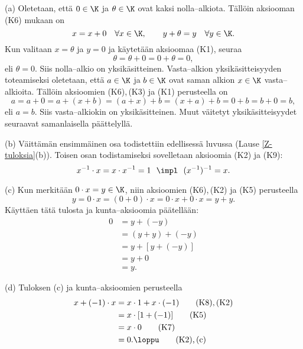 \tod (a) Oletetaan, että $0 \in \K$ ja $\theta \in \K$ ovat kaksi nolla--alkiota. Tällöin
aksiooman (K6) mukaan on
\[
x = x + 0 \quad \forall x \in \K, \quad \quad y + \theta = y \quad \forall y \in \K.
\]
Kun valitaan $x = \theta$ ja $y = 0$ ja käytetään aksioomaa (K1), seuraa
\[
\theta = \theta + 0 = 0 + \theta = 0,
\]
eli $\theta = 0$. Siis nolla--alkio on yksikäsitteinen. Vasta--alkion yksikäsitteisyyden 
toteamiseksi oletetaan, että $a\in\K$ ja $b\in\K$ ovat saman alkion $x \in \K$ 
vasta--alkioita. Tällöin aksioomien (K6),\,(K3) ja (K1) perusteella on
\[
a=a+0=a+(x+b)=(a+x)+b=(x+a)+b=0+b=b+0=b,
\]
eli $a=b$. Siis vasta--alkiokin on yksikäsitteinen. Muut väitetyt yksikäsitteisyydet 
seuraavat samanlaisella päättelyllä.

(b) Väittämän ensimmäinen osa todistettiin edellisessä luvussa (Lause \ref{Z-tuloksia}(b)).
Toisen osan todistamiseksi sovelletaan aksioomia (K2) ja (K9):
\[
x^{-1} \cdot x = x \cdot x^{-1} = 1\ \ \impl\ \ (x^{-1})^{-1}=x.
\]

(c) Kun merkitään $0 \cdot x = y\in\K$, niin aksioomien (K6),\,(K2) ja (K5) perusteella
\begin{equation}
y = 0 \cdot x = (0 + 0) \cdot x = 0 \cdot x + 0 \cdot x = y+y.  \tag{$\star$}
\end{equation}
Käyttäen tätä tulosta ja kunta--aksioomia päätellään:
\begin{align}
0 &= y+(-y)      \tag{K7} \\
  &= (y+y)+(-y)  \tag{$\star$} \\
  &= y+[y+(-y)]  \tag{K3} \\
  &= y+0         \tag{K7} \\
  &= y.          \tag{K6}
\end{align}

(d) Tuloksen (c) ja kunta--aksioomien perusteella
\begin{align}
x + (-1) \cdot x &= x \cdot 1 + x \cdot (-1)  \tag*{(K8),\,(K2)} \\
                 &= x \cdot [1 + (-1)]        \tag{K5} \\
                 &= x \cdot 0                 \tag{K7} \\
                 &= 0. \loppu                 \tag*{(K2),\,(c)}
\end{align}

